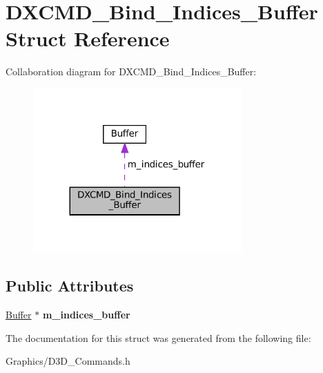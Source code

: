 \hypertarget{structDXCMD__Bind__Indices__Buffer}{}\section{D\+X\+C\+M\+D\+\_\+\+Bind\+\_\+\+Indices\+\_\+\+Buffer Struct Reference}
\label{structDXCMD__Bind__Indices__Buffer}


Collaboration diagram for D\+X\+C\+M\+D\+\_\+\+Bind\+\_\+\+Indices\+\_\+\+Buffer\+:
\nopagebreak
\begin{figure}[H]
\begin{center}
\leavevmode
\includegraphics[width=227pt]{structDXCMD__Bind__Indices__Buffer__coll__graph}
\end{center}
\end{figure}
\subsection*{Public Attributes}
\begin{DoxyCompactItemize}
\item 
\mbox{\label{structDXCMD__Bind__Indices__Buffer_a6f6eedb86f45db5d40f3526641ec5746}} 
\hyperlink{classBuffer}{Buffer} $\ast$ {\bfseries m\+\_\+indices\+\_\+buffer}
\end{DoxyCompactItemize}


The documentation for this struct was generated from the following file\+:\begin{DoxyCompactItemize}
\item 
Graphics/D3\+D\+\_\+\+Commands.\+h\end{DoxyCompactItemize}

